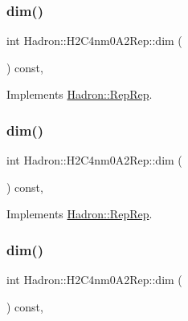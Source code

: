 \subsubsection{\texorpdfstring{dim()}{dim()}\hspace{0.1cm}{\footnotesize\ttfamily [3/5]}}
{\footnotesize\ttfamily int Hadron\+::\+H2\+C4nm0\+A2\+Rep\+::dim (\begin{DoxyParamCaption}{ }\end{DoxyParamCaption}) const\hspace{0.3cm}{\ttfamily [inline]}, {\ttfamily [virtual]}}



Implements \mbox{\hyperlink{structHadron_1_1RepRep_a92c8802e5ed7afd7da43ccfd5b7cd92b}{Hadron\+::\+Rep\+Rep}}.

\mbox{\label{structHadron_1_1H2C4nm0A2Rep_a4aa552a74cfc75c88b7a8a4137e501af}} 
\subsubsection{\texorpdfstring{dim()}{dim()}\hspace{0.1cm}{\footnotesize\ttfamily [4/5]}}
{\footnotesize\ttfamily int Hadron\+::\+H2\+C4nm0\+A2\+Rep\+::dim (\begin{DoxyParamCaption}{ }\end{DoxyParamCaption}) const\hspace{0.3cm}{\ttfamily [inline]}, {\ttfamily [virtual]}}



Implements \mbox{\hyperlink{structHadron_1_1RepRep_a92c8802e5ed7afd7da43ccfd5b7cd92b}{Hadron\+::\+Rep\+Rep}}.

\mbox{\label{structHadron_1_1H2C4nm0A2Rep_a4aa552a74cfc75c88b7a8a4137e501af}} 
\subsubsection{\texorpdfstring{dim()}{dim()}\hspace{0.1cm}{\footnotesize\ttfamily [5/5]}}
{\footnotesize\ttfamily int Hadron\+::\+H2\+C4nm0\+A2\+Rep\+::dim (\begin{DoxyParamCaption}{ }\end{DoxyParamCaption}) const\hspace{0.3cm}{\ttfamily [inline]}, {\ttfamily [virtual]}}



